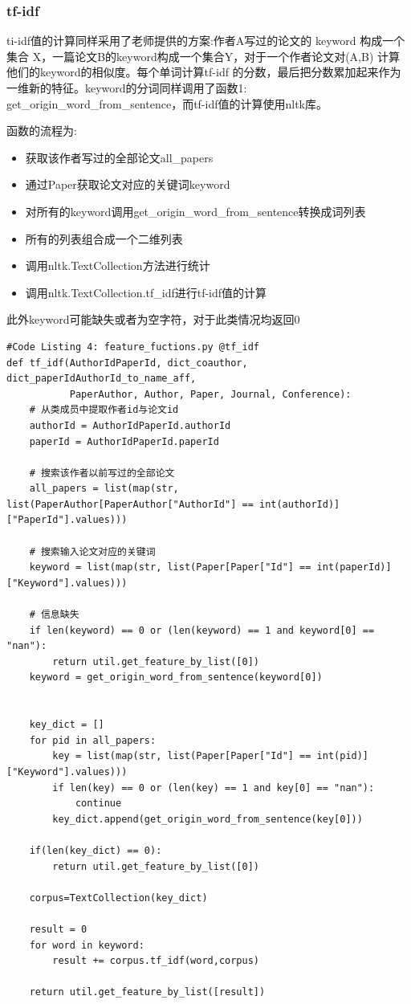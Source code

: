 \documentclass{mcmthesis}
\begin{document}
		\subsubsection{tf-idf}
			\par ti-idf值的计算同样采用了老师提供的方案:作者A写过的论文的 keyword 构成一个集合 X，一篇论文B的keyword构成一个集合Y，对于一个作者论文对(A,B)
			计算他们的keyword的相似度。每个单词计算tf-idf 的分数，最后把分数累加起来作为一维新的特征。keyword的分词同样调用了函数1: get\_origin\_word\_from\_sentence，而tf-idf值的计算使用nltk库。
			\par 函数的流程为:
			\begin{itemize}
				\item 获取该作者写过的全部论文all\_papers
				\item 通过Paper获取论文对应的关键词keyword
				\item 对所有的keyword调用get\_origin\_word\_from\_sentence转换成词列表
				\item 所有的列表组合成一个二维列表
				\item 调用nltk.TextCollection方法进行统计
				\item 调用nltk.TextCollection.tf\_idf进行tf-idf值的计算
			\end{itemize}
			\par 此外keyword可能缺失或者为空字符，对于此类情况均返回0
				{\setmainfont{Courier New Bold}              
				\begin{lstlisting}
#Code Listing 4: feature_fuctions.py @tf_idf
def tf_idf(AuthorIdPaperId, dict_coauthor, dict_paperIdAuthorId_to_name_aff, 
		   PaperAuthor, Author, Paper, Journal, Conference):
    # 从类成员中提取作者id与论文id
    authorId = AuthorIdPaperId.authorId
    paperId = AuthorIdPaperId.paperId
    
    # 搜索该作者以前写过的全部论文
    all_papers = list(map(str, list(PaperAuthor[PaperAuthor["AuthorId"] == int(authorId)]["PaperId"].values)))

    # 搜索输入论文对应的关键词
    keyword = list(map(str, list(Paper[Paper["Id"] == int(paperId)]["Keyword"].values)))

    # 信息缺失
    if len(keyword) == 0 or (len(keyword) == 1 and keyword[0] == "nan"):
        return util.get_feature_by_list([0])
    keyword = get_origin_word_from_sentence(keyword[0])


    key_dict = []
    for pid in all_papers:
        key = list(map(str, list(Paper[Paper["Id"] == int(pid)]["Keyword"].values)))
        if len(key) == 0 or (len(key) == 1 and key[0] == "nan"):
            continue
        key_dict.append(get_origin_word_from_sentence(key[0]))

    if(len(key_dict) == 0):
        return util.get_feature_by_list([0])

    corpus=TextCollection(key_dict)  

    result = 0
    for word in keyword:
        result += corpus.tf_idf(word,corpus)
    
    return util.get_feature_by_list([result])
				\end{lstlisting}
			}
\end{document}
